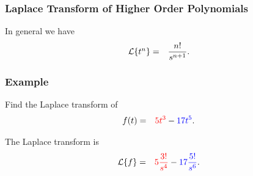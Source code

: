 \begin{frame}
  \frametitle{Laplace Transform of Higher Order Polynomials}

  In general we have
  \begin{eqnarray*}
    \laplace{t^n} & = & \frac{n!}{s^{n+1}}.
  \end{eqnarray*}

\end{frame}


\begin{frame}
  \frametitle{Example}

  Find the Laplace transform of 
  \begin{eqnarray*}
    f(t) & = & {\color{red}5 t^3} - {\color{blue}17 t^5}.
  \end{eqnarray*}

  {

    The Laplace transform is
    \begin{eqnarray*}
      \laplace{f} & = & \redText{5 \frac{3!}{s^4}} - \blueText{17 \frac{5!}{s^6}}.
    \end{eqnarray*}

  }

\end{frame}


%
%
%
%
%
%
%
%
%
%    
%
%

